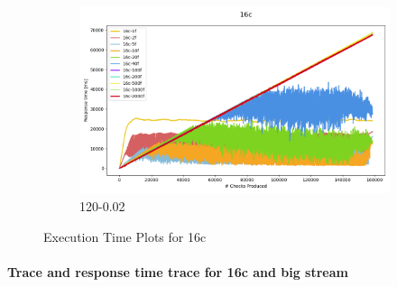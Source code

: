 \documentclass[12pt,a4paper]{article}
\begin{document}
\begin{figure}[H]
    \vspace{0.5cm} %
    \begin{subfigure}[b]{\textwidth}
        \centering
        \includegraphics[scale=0.5]{../processed/NRT/small/checks/120-0.02/fixedcores/16c/plots/traces-response-time-reduced.png}
        \caption{120-0.02}
    \end{subfigure}

    \caption{Execution Time Plots for 16c}
    \label{img:exps-read-input-variants}
\end{figure}



\paragraph{Trace and response time trace for 16c and big stream\\}
\end{document}
